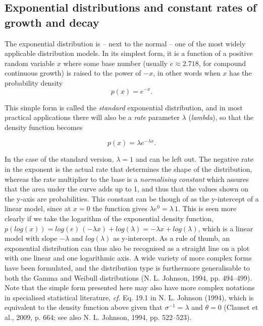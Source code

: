 \documentclass[
  12pt,
]{book}
\begin{document}
\hypertarget{exponential-distributions-and-constant-rates-of-growth-and-decay}{%
\subsection{Exponential distributions and constant rates of growth and decay}\label{exponential-distributions-and-constant-rates-of-growth-and-decay}}

The exponential distribution is -- next to the normal -- one of the most widely applicable distribution models. In its simplest form, it is a function of a positive random variable \(x\) where some base number (usually \(e \approx 2.718\), for compound continuous growth) is raised to the power of \(-x\), in other words when \(x\) has the probability density \[p(x) = e^{-x}.\]

This simple form is called the \emph{standard} exponential distribution, and in most practical applications there will also be a \emph{rate} parameter \(\lambda\) (\emph{lambda}), so that the density function becomes

\begin{equation} p(x) = \lambda e^{-\lambda x}.
\label{eq:exponential}
\end{equation}

In the case of the standard version, \(\lambda = 1\) and can be left out. The negative rate in the exponent is the actual rate that determines the shape of the distribution, whereas the rate multiplier to the base is a \emph{normalising constant} which assures that the area under the curve adds up to 1, and thus that the values shown on the y-axis are probabilities. This constant can be though of as the y-intercept of a linear model, since at \(x = 0\) the function gives \(\lambda e^0 = \lambda\,1\). This is seen more clearly if we take the logarithm of the exponential density function, \(p(log(x)) = log(e)\,(-\lambda x) + log(\lambda) = -\lambda x+log(\lambda)\), which is a linear model with slope \(-\lambda\) and \(log(\lambda)\) as y-intercept. As a rule of thumb, an exponential distribution can thus also be recognised as a straight line on a plot with one linear and one logarithmic axis. A wide variety of more complex forms have been formulated, and the distribution type is furthermore generalisable to both the Gamma and Weibull distributions (N. L. Johnson, 1994, pp. 494--499). Note that the simple form presented here may also have more complex notations in specialised statistical literature, \emph{cf}. Eq. 19.1 in N. L. Johnson (1994), which is equivalent to the density function above given that \(\sigma^{-1} = \lambda\) and \(\theta = 0\) (Clauset et al., 2009, p. 664; see also N. L. Johnson, 1994, pp. 522--523).
\end{document}
